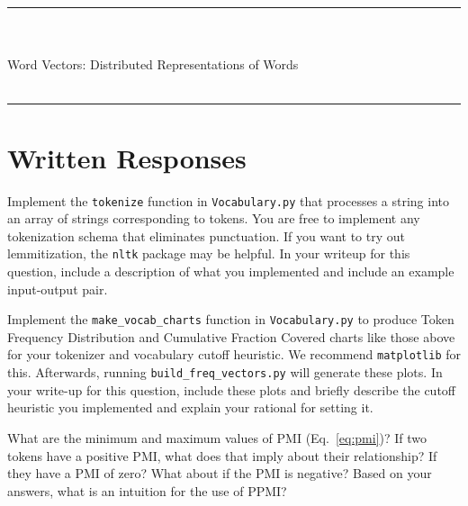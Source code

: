 \documentclass[a4paper,10pt]{article}
\begin{document}
\sffamily

\begin{center}
\noindent\rule{\textwidth}{1pt}\\[10pt]
{\color{blue!60}{AI539 Natural Language Processing with Deep Learning -- Homework 1}}\\[10pt]
{\LARGE Word Vectors: Distributed Representations of Words}\\[10pt]
{\color{blue!60}{Name}}\\[10pt]
\noindent\rule{\textwidth}{1pt}
\end{center}

\section{Written Responses}
\vspace{5pt}
\begin{taskbox}
 Implement the \texttt{tokenize} function in \texttt{Vocabulary.py} that processes a string into an array of strings corresponding to tokens. You are free to implement any tokenization schema that eliminates punctuation. If you want to try out lemmitization, the \texttt{nltk} package may be helpful. In your writeup for this question, include a description of what you implemented and include an example input-output pair.
\end{taskbox}
\vspace{5pt}

\vspace{5pt}
\begin{taskbox}
 Implement the \texttt{make\_vocab\_charts} function in \texttt{Vocabulary.py} to produce Token Frequency Distribution and Cumulative Fraction Covered charts like those above for your tokenizer and vocabulary cutoff heuristic. We recommend \texttt{matplotlib} for this. Afterwards, running \texttt{build\_freq\_vectors.py} will generate these plots. In your write-up for this question, include these plots and briefly describe the cutoff heuristic you implemented and explain your rational for setting it. 
\end{taskbox}
\vspace{5pt}

\vspace{5pt}
\begin{taskbox}
 What are the minimum and maximum values of PMI (Eq.~\ref{eq:pmi})? If two tokens have a positive PMI, what does that imply about their relationship? If they have a PMI of zero? What about if the PMI is negative? Based on your answers, what is an intuition for the use of PPMI?
\end{taskbox}
\vspace{5pt}
\end{document}
